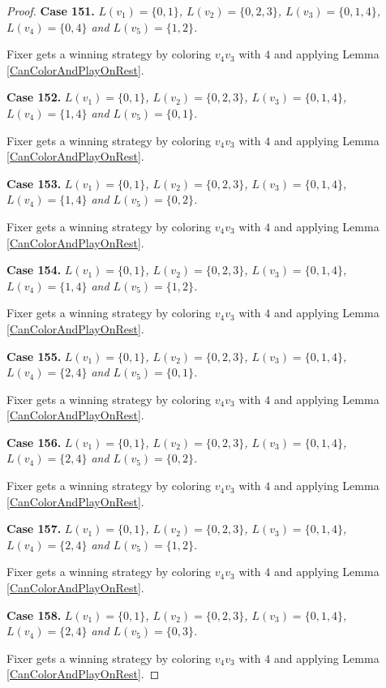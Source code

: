 \documentclass[12pt]{amsart}
\theoremstyle{plain}
\theoremstyle{definition}
\theoremstyle{remark}
\begin{document}
\begin{proof}
\noindent\textbf{Case 151.  }\textit{$L(v_1) = \{0, 1\}$, $L(v_2) = \{0, 2, 3\}$, $L(v_3) = \{0, 1, 4\}$, $L(v_4) = \{0, 4\}$ and $L(v_5) = \{1, 2\}$.}

Fixer gets a winning strategy by coloring $v_4v_3$ with $4$ and applying Lemma \ref{CanColorAndPlayOnRest}.

\noindent\textbf{Case 152.  }\textit{$L(v_1) = \{0, 1\}$, $L(v_2) = \{0, 2, 3\}$, $L(v_3) = \{0, 1, 4\}$, $L(v_4) = \{1, 4\}$ and $L(v_5) = \{0, 1\}$.}

Fixer gets a winning strategy by coloring $v_4v_3$ with $4$ and applying Lemma \ref{CanColorAndPlayOnRest}.

\noindent\textbf{Case 153.  }\textit{$L(v_1) = \{0, 1\}$, $L(v_2) = \{0, 2, 3\}$, $L(v_3) = \{0, 1, 4\}$, $L(v_4) = \{1, 4\}$ and $L(v_5) = \{0, 2\}$.}

Fixer gets a winning strategy by coloring $v_4v_3$ with $4$ and applying Lemma \ref{CanColorAndPlayOnRest}.

\noindent\textbf{Case 154.  }\textit{$L(v_1) = \{0, 1\}$, $L(v_2) = \{0, 2, 3\}$, $L(v_3) = \{0, 1, 4\}$, $L(v_4) = \{1, 4\}$ and $L(v_5) = \{1, 2\}$.}

Fixer gets a winning strategy by coloring $v_4v_3$ with $4$ and applying Lemma \ref{CanColorAndPlayOnRest}.

\noindent\textbf{Case 155.  }\textit{$L(v_1) = \{0, 1\}$, $L(v_2) = \{0, 2, 3\}$, $L(v_3) = \{0, 1, 4\}$, $L(v_4) = \{2, 4\}$ and $L(v_5) = \{0, 1\}$.}

Fixer gets a winning strategy by coloring $v_4v_3$ with $4$ and applying Lemma \ref{CanColorAndPlayOnRest}.

\noindent\textbf{Case 156.  }\textit{$L(v_1) = \{0, 1\}$, $L(v_2) = \{0, 2, 3\}$, $L(v_3) = \{0, 1, 4\}$, $L(v_4) = \{2, 4\}$ and $L(v_5) = \{0, 2\}$.}

Fixer gets a winning strategy by coloring $v_4v_3$ with $4$ and applying Lemma \ref{CanColorAndPlayOnRest}.

\noindent\textbf{Case 157.  }\textit{$L(v_1) = \{0, 1\}$, $L(v_2) = \{0, 2, 3\}$, $L(v_3) = \{0, 1, 4\}$, $L(v_4) = \{2, 4\}$ and $L(v_5) = \{1, 2\}$.}

Fixer gets a winning strategy by coloring $v_4v_3$ with $4$ and applying Lemma \ref{CanColorAndPlayOnRest}.

\noindent\textbf{Case 158.  }\textit{$L(v_1) = \{0, 1\}$, $L(v_2) = \{0, 2, 3\}$, $L(v_3) = \{0, 1, 4\}$, $L(v_4) = \{2, 4\}$ and $L(v_5) = \{0, 3\}$.}

Fixer gets a winning strategy by coloring $v_4v_3$ with $4$ and applying Lemma \ref{CanColorAndPlayOnRest}.


\end{proof}
\end{document}
